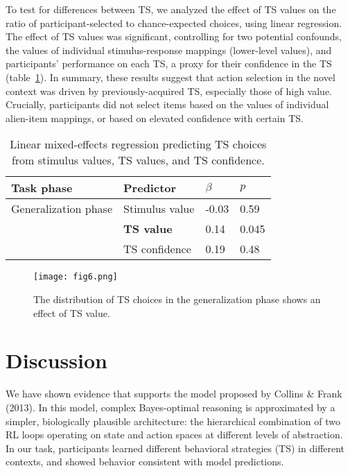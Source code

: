 \documentclass[10pt, letterpaper]{article}
\begin{document}
To test for differences between TS, we analyzed the effect of TS values on the ratio of participant-selected to chance-expected choices, using linear regression. The effect of TS values was significant, controlling for two potential confounds, the values of individual stimulus-response mappings (lower-level values), and participants' performance on each TS, a proxy for their confidence in the TS (table~\ref{table:TS creation}). In summary, these results suggest that action selection in the novel context was driven by previously-acquired TS, especially those of high value. Crucially, participants did not select items based on the values of individual alien-item mappings, or based on elevated confidence with certain TS. 

\begin{table}[!ht]
\begin{center} 
\caption{Linear mixed-effects regression predicting TS choices from stimulus values, TS values, and TS confidence.} 
\label{table:TS creation} 
\vskip 0.1in
\small{
\begin{tabular}{llll} 
\hline
Task phase          &   Predictor               &   $\beta$ &   $p$   \\
\hline
Generalization phase&   Stimulus value          &   -0.03   &   0.59  \\
                    &   {\bf TS value}          &   0.14    &   0.045 \\
                    &   TS confidence           &   0.19    &   0.48  \\
\hline
\end{tabular}
}
\end{center} 
\end{table}

\begin{figure}[ht]
    \begin{center}
	\texttt{[image: fig6.png]}
    \end{center}
    \caption{The distribution of TS choices in the generalization phase shows an effect of TS value.}
    \label{figure:TS creation distribution}
\end{figure}

\section{Discussion}

We have shown evidence that supports the model proposed by Collins \& Frank (2013). In this model, complex Bayes-optimal reasoning is approximated by a simpler, biologically plausible architecture: the hierarchical combination of two RL loops operating on state and action spaces at different levels of abstraction. In our task, participants learned different behavioral strategies (TS) in different contexts, and showed behavior consistent with model predictions.
\end{document}
